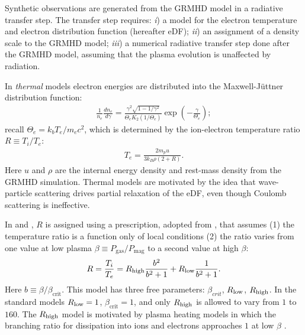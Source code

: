 Synthetic observations are generated from the GRMHD model in a radiative transfer step.
The transfer step requires: %
\emph{i}) a model for the electron temperature and electron distribution function (hereafter eDF);
\emph{ii}) an assignment of a density scale to the GRMHD model;
\emph{iii}) a numerical radiative transfer step done after the GRMHD model, assuming that the plasma evolution is unaffected by radiation.


In {\it thermal} models electron energies are distributed into the Maxwell-J{\"u}ttner distribution function:
\begin{align}
\frac{1}{n_e}\frac{dn_e}{d\gamma}= \frac{\gamma^2 \sqrt{1-1/\gamma^2}} {\Theta_e K_2(1/\Theta_e)} \exp\left(-\frac{\gamma}{\Theta_e}\right);
\end{align}
recall $\Theta_e=k_b T_e/m_e c^2$, which is determined by the ion-electron temperature ratio $R \equiv T_i/T_e$:
\begin{align}
T_e=\frac{2 m_p u}{3 k_B \rho (2+R)}.
\end{align}
Here $u$ and $\rho$ are the internal energy density and rest-mass density from the GRMHD simulation.  Thermal models are motivated by the idea that wave-particle scattering drives partial relaxation of the eDF, even though Coulomb scattering is ineffective.

In  and , $R$ is assigned using a prescription, adopted from \cite{2016A&A...586A..38M}, that assumes (1) the temperature ratio is a function only of local conditions (2) the ratio varies from one value at low plasma $\beta \equiv P_\mathrm{gas}/P_\mathrm{mag}$ to a second value at high $\beta$:
\begin{equation}
R = \frac{T_i}{T_e} = \Rh \frac{b^2}{b^2+1} + \Rl \frac{1}{b^2+1}.
\end{equation}
Here $b \equiv \beta/\beta_\mathrm{crit}$. This model has three free parameters: $\beta_{crit}$, $R_\mathrm{low}$, $R_\mathrm{high}$.  In the standard models $R_\mathrm{low} = 1$, $\beta_\mathrm{crit} = 1$, and only $R_\mathrm{high}$ is allowed to vary from $1$ to $160$.  The $R_\mathrm{high}$ model is motivated by plasma heating models in which the branching ratio for dissipation into ions and electrons approaches $1$ at low $\beta$ \citep[e.g.,][]{2010MNRAS.409L.104H,Kawazura771}.

